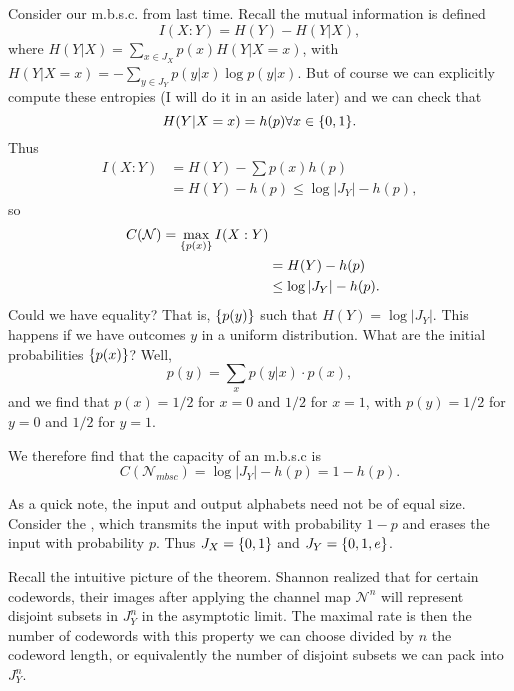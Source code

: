 \begin{exm}
    Consider our m.b.s.c. from last time. Recall the mutual information is defined
    \begin{equation}
        I(X:Y)=H(Y)-H(Y|X),
    \end{equation}
    where $H(Y|X)=\sum_{x\in J_X} p(x) H(Y|X=x)$, with $H(Y|X=x)=-\sum_{y\in J_Y} p(y|x) \log p(y|x).$
    But of course we can explicitly compute these entropies (I will do it in an aside later) and we can check that
    \begin{equation}
        H(Y|X=x)=h(p) \forall x\in \{0,1\}.
    \end{equation}
    Thus
    \begin{align*}
        I(X:Y)&=H(Y)-\sum p(x) h(p)\\
        &= H(Y) - h(p) \leq \log |J_Y|-h(p),
    \end{align*}
    so
    \begin{align*}
        C(\mathcal{N})=\max_{\{ p(x)\}} I(X:Y)\\
        &= H(Y)-h(p)\\
        &\leq \log |J_Y|-h(p).
    \end{align*}
    Could we have equality? That is, $\{p(y)\}$ such that $H(Y)=\log|J_Y|$. This happens if we have outcomes $y$ in a uniform distribution. What are the initial probabilities $\{p(x)\}$? Well,
    \begin{equation}
        p(y)=\sum_x p(y|x) \cdot p(x),
    \end{equation}
    and we find that $p(x)=1/2$ for $x=0$ and $1/2$ for $x=1$, with $p(y) = 1/2$ for $y=0$ and $1/2$ for $y=1$.
    
    We therefore find that the capacity of an m.b.s.c is
    \begin{equation}
        C(\mathcal{N}_{mbsc})=\log|J_Y|-h(p) = 1 - h(p).
    \end{equation}
\end{exm}

As a quick note, the input and output alphabets need not be of equal size. Consider the , which transmits the input with probability $1-p$ and erases the input with probability $p$. Thus $J_X=\{0,1\}$ and $J_Y=\{0,1,e\}$.

Recall the intuitive picture of the theorem. Shannon realized that for certain codewords, their images after applying the channel map $\mathcal{N}^n$ will represent disjoint subsets in $J_Y^n$ in the asymptotic limit. The maximal rate is then the number of codewords with this property we can choose divided by $n$ the codeword length, or equivalently the number of disjoint subsets we can pack into $J_Y^n$.

